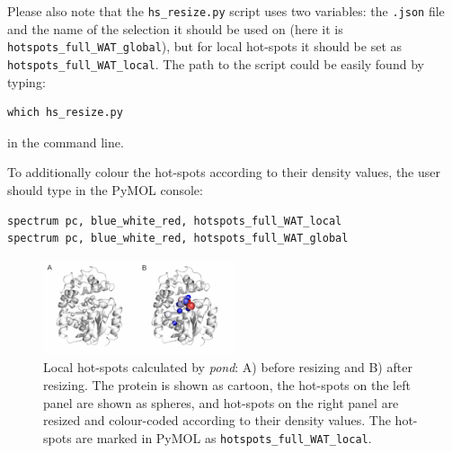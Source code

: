 \documentclass[9pt,tutorial]{livecoms}
\begin{document}
Please also note that the \texttt{hs\_resize.py} script uses two variables: the \texttt{.json} file and the name of the selection it should be used on (here it is \texttt{hotspots\_full\_WAT\_global}), but for local hot-spots it should be set as \texttt{hotspots\_full\_WAT\_local}.
The path to the script could be easily found by typing:
\begin{lstlisting}
which hs_resize.py
\end{lstlisting}
in the command line.

To additionally colour the hot-spots according to their density values, the user should type in the PyMOL console:
\begin{lstlisting}[columns=fullflexible]
spectrum pc, blue_white_red, hotspots_full_WAT_local
spectrum pc, blue_white_red, hotspots_full_WAT_global
\end{lstlisting}

\begin{figure}[ht!]
\centering
\includegraphics[width=0.5\textwidth]{Tut4.3.png}
\caption{Local hot-spots calculated by \textit{pond}: A) before resizing and B) after resizing. The protein is shown as cartoon, the hot-spots on the left panel are shown as spheres, and hot-spots on the right panel are resized and colour-coded according to their density values. The hot-spots are marked in PyMOL as \texttt{hotspots\_full\_WAT\_local}.}
\label{Tut4.3}
\end{figure}
\end{document}
